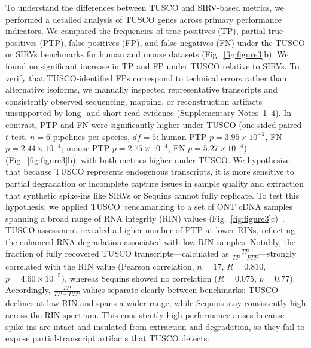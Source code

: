 \documentclass[pdflatex,sn-nature]{sn-jnl}%
\begin{document}
To understand the differences between TUSCO and SIRV-based metrics, we performed a detailed analysis of TUSCO genes across primary performance indicators. We compared the frequencies of true positives (TP), partial true positives (PTP), false positives (FP), and false negatives (FN) under the TUSCO or SIRVs benchmarks for human and mouse datasets (Fig.~\ref{fig:figure3}b). We found no significant increase in TP and FP under TUSCO relative to SIRVs. To verify that TUSCO-identified FPs correspond to technical errors rather than alternative isoforms, we manually inspected representative transcripts and consistently observed sequencing, mapping, or reconstruction artifacts unsupported by long- and short-read evidence (Supplementary Notes~1--4). In contrast, PTP and FN were significantly higher under TUSCO (one-sided paired $t$-test, $n = 6$ pipelines per species, $df = 5$: human PTP $p = 3.95 \times 10^{-2}$, FN $p = 2.44 \times 10^{-4}$; mouse PTP $p = 2.75 \times 10^{-4}$, FN $p = 5.27 \times 10^{-4}$) (Fig.~\ref{fig:figure3}b), with both metrics higher under TUSCO. We hypothesize that because TUSCO represents endogenous transcripts, it is more sensitive to partial degradation or incomplete capture issues in sample quality and extraction that synthetic spike-ins like SIRVs or Sequins cannot fully replicate. To test this hypothesis, we applied TUSCO benchmarking to a set of ONT cDNA samples spanning a broad range of RNA integrity (RIN) values (Fig.~\ref{fig:figure3}c)~\cite{Prawer2023Pervasive}. TUSCO assessment revealed a higher number of PTP at lower RINs, reflecting the enhanced RNA degradation associated with low RIN samples. Notably, the fraction of fully recovered TUSCO transcripts---calculated as $\frac{TP}{TP + PTP}$---strongly correlated with the RIN value (Pearson correlation, $n = 17$, $R = 0.810$, $p = 4.60 \times 10^{-5}$), whereas Sequins showed no correlation ($R = 0.075$, $p = 0.77$). Accordingly, $\frac{TP}{TP + PTP}$ values separate clearly between benchmarks: TUSCO declines at low RIN and spans a wider range, while Sequins stay consistently high across the RIN spectrum. This consistently high performance arises because spike-ins are intact and insulated from extraction and degradation, so they fail to expose partial-transcript artifacts that TUSCO detects.
\end{document}
